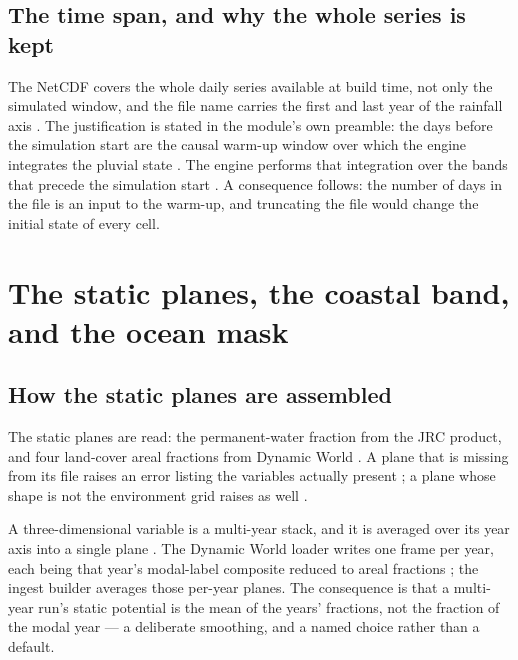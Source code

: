 \documentclass[11pt,a4paper]{article} \usepackage[utf8]{inputenc} \usepackage{lmodern} \usepackage[T1]{fontenc}
\begin{document}
\subsection{The time span, and why the whole series is kept}

The NetCDF covers the whole daily series available at build time, not only the simulated window,
and the file name carries the first and last year of the rainfall axis
. The justification is stated in the
module's own preamble: the days before the simulation start are the causal warm-up window over
which the engine integrates the pluvial state
. The engine performs that integration
over the bands that precede the simulation start
. A consequence follows: the number
of days in the file is an input to the warm-up, and truncating the file would change the initial
state of every cell.

\section{The static planes, the coastal band, and the ocean mask} \label{sec:statics}

\subsection{How the static planes are assembled}

The  static planes are read: the permanent-water
fraction from the JRC product, and four
land-cover areal fractions from Dynamic World
. A plane that is missing from its file
raises an error listing the variables actually present
; a plane whose shape is not the
environment grid raises as well .

A three-dimensional variable is a multi-year stack, and it is averaged over its year axis into a
single plane . The Dynamic World loader
writes one frame per year, each being that year's modal-label composite reduced to areal
fractions ; the
ingest builder averages those per-year planes. The consequence is that a multi-year run's static
potential is the mean of the years' fractions, not the fraction of the modal year --- a
deliberate smoothing, and a named choice rather than a default.
\end{document}
